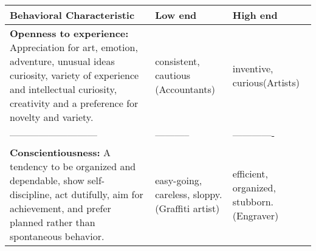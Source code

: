 \documentclass[]{book}
\begin{document}
\begin{longtable}[]{@{}lll@{}}
\toprule
\begin{minipage}[b]{0.44\columnwidth}\raggedright
Behavioral Characteristic\strut
\end{minipage} & \begin{minipage}[b]{0.28\columnwidth}\raggedright
Low end\strut
\end{minipage} & \begin{minipage}[b]{0.20\columnwidth}\raggedright
High end\strut
\end{minipage}\tabularnewline
\midrule
\endhead
\begin{minipage}[t]{0.44\columnwidth}\raggedright
\textbf{Openness to experience:} Appreciation for art, emotion, adventure, unusual ideas curiosity, variety of experience and intellectual curiosity, creativity and a preference for novelty and variety.\strut
\end{minipage} & \begin{minipage}[t]{0.28\columnwidth}\raggedright
consistent, cautious (Accountants)\strut
\end{minipage} & \begin{minipage}[t]{0.20\columnwidth}\raggedright
inventive, curious(Artists)\strut
\end{minipage}\tabularnewline
\begin{minipage}[t]{0.44\columnwidth}\raggedright
---------------------------\strut
\end{minipage} & \begin{minipage}[t]{0.28\columnwidth}\raggedright
-----------\strut
\end{minipage} & \begin{minipage}[t]{0.20\columnwidth}\raggedright
-------------\strut
\end{minipage}\tabularnewline
\begin{minipage}[t]{0.44\columnwidth}\raggedright
\textbf{Conscientiousness:} A tendency to be organized and dependable, show self-discipline, act dutifully, aim for achievement, and prefer planned rather than spontaneous behavior.\strut
\end{minipage} & \begin{minipage}[t]{0.28\columnwidth}\raggedright
easy-going, careless, sloppy. (Graffiti artist)\strut
\end{minipage} & \begin{minipage}[t]{0.20\columnwidth}\raggedright
efficient, organized, stubborn. (Engraver)\strut
\end{minipage}\tabularnewline

\end{longtable}
\end{document}
